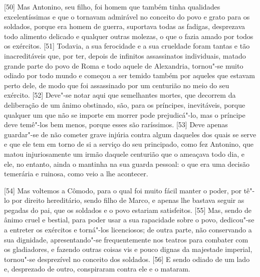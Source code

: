 {[}50{]} Mas Antonino, seu filho, foi homem que também tinha qualidades
excelentíssimas e que o tornavam admirável no conceito do povo e grato
para os soldados, porque era homem de guerra, suportava todas as
fadigas, desprezava todo alimento delicado e qualquer outras molezas, o
que o fazia amado por todos os exércitos. {[}51{]} Todavia, a sua
ferocidade e a sua crueldade foram tantas e tão inacreditáveis que, por
ter, depois de infinitos assassinatos individuais, matado grande parte
do povo de Roma e todo aquele de Alexandria, tornou"-se muito odiado por
todo mundo e começou a ser temido também por aqueles que estavam perto
dele, de modo que foi assassinado por um centurião no meio do seu
exército. {[}52{]} Deve"-se notar aqui que semelhantes mortes, que
decorrem da deliberação de um ânimo obstinado, são, para os príncipes,
inevitáveis, porque qualquer um que não se importe em morrer pode
prejudicá"-lo, mas o príncipe deve temê"-los bem menos, porque esses são
raríssimos. {[}53{]} Deve apenas guardar"-se de não cometer grave injúria
contra algum daqueles dos quais se serve e que ele tem em torno de si a
serviço do seu principado, como fez Antonino, que matou injuriosamente
um irmão daquele centurião que o ameaçava todo dia, e ele, no entanto,
ainda o mantinha na sua guarda pessoal: o que era uma decisão temerária
e ruinosa, como veio a lhe acontecer.

{[}54{]} Mas voltemos a Cômodo, para o qual foi muito fácil manter o
poder, por tê"-lo por direito hereditário, sendo filho de Marco, e apenas
lhe bastava seguir as pegadas do pai, que os soldados e o povo estariam
satisfeitos. {[}55{]} Mas, sendo de ânimo cruel e bestial, para poder
usar a sua rapacidade sobre o povo, dedicou"-se a entreter os exércitos e
torná"-los licenciosos; de outra parte, não conservando a sua dignidade,
apresentando"-se frequentemente nos teatros para combater com os
gladiadores, e fazendo outras coisas vis e pouco dignas da majestade
imperial, tornou"-se desprezível no conceito dos soldados. {[}56{]} E
sendo odiado de um lado e, desprezado de outro, conspiraram contra ele e
o mataram.

